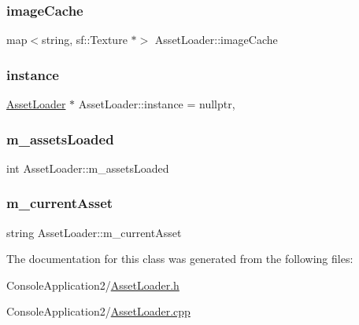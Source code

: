 \subsubsection{\texorpdfstring{image\+Cache}{imageCache}}
{\footnotesize\ttfamily map$<$string, sf\+::\+Texture $\ast$$>$ Asset\+Loader\+::image\+Cache\hspace{0.3cm}{\ttfamily [protected]}}

\hypertarget{class_asset_loader_a8109777021214db1df6aace310c9f842}{}\label{class_asset_loader_a8109777021214db1df6aace310c9f842} 
\subsubsection{\texorpdfstring{instance}{instance}}
{\footnotesize\ttfamily \hyperlink{class_asset_loader}{Asset\+Loader} $\ast$ Asset\+Loader\+::instance = nullptr\hspace{0.3cm}{\ttfamily [static]}, {\ttfamily [protected]}}

\hypertarget{class_asset_loader_a46d605269740622e52033a2d15f1041a}{}\label{class_asset_loader_a46d605269740622e52033a2d15f1041a} 
\subsubsection{\texorpdfstring{m\+\_\+assets\+Loaded}{m\_assetsLoaded}}
{\footnotesize\ttfamily int Asset\+Loader\+::m\+\_\+assets\+Loaded\hspace{0.3cm}{\ttfamily [protected]}}

\hypertarget{class_asset_loader_ad7816a644b0358ff24f308beb6c27b1e}{}\label{class_asset_loader_ad7816a644b0358ff24f308beb6c27b1e} 
\subsubsection{\texorpdfstring{m\+\_\+current\+Asset}{m\_currentAsset}}
{\footnotesize\ttfamily string Asset\+Loader\+::m\+\_\+current\+Asset\hspace{0.3cm}{\ttfamily [protected]}}



The documentation for this class was generated from the following files\+:\begin{DoxyCompactItemize}
\item 
Console\+Application2/\hyperlink{_asset_loader_8h}{Asset\+Loader.\+h}\item 
Console\+Application2/\hyperlink{_asset_loader_8cpp}{Asset\+Loader.\+cpp}\end{DoxyCompactItemize}
